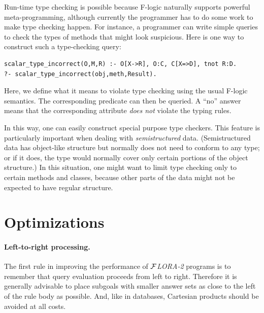 \documentclass[11pt]{article}
\newcommand{\FLORA}{{\mbox{${\cal F}${\small\it LORA}\rm\emph{-2}}}\xspace}
\newcommand{\fl}{\mbox{F-logic}\xspace}
\begin{document}
Run-time type checking is possible because \fl naturally supports powerful
meta-programming, although currently the programmer has to do some work to
make type checking happen.  For instance, a programmer can write simple
queries to check the types of methods that might look suspicious.  Here is
one way to construct such a type-checking query:
\begin{verbatim}
scalar_type_incorrect(O,M,R) :- O[X->R], O:C, C[X=>D], tnot R:D.
?- scalar_type_incorrect(obj,meth,Result).
\end{verbatim}
Here, we define what it means to violate type checking using the usual
\fl semantics. The corresponding predicate can then be queried. A
``no'' answer means that the corresponding attribute \emph{does not}
violate the typing rules.

In this way, one can easily construct special purpose type checkers.  This
feature is particularly important when dealing with \emph{semistructured}
data. (Semistructured data has object-like structure but normally does not
need to conform to any type; or if it does, the type would normally cover
only certain portions of the object structure.) In this situation, one
might want to limit type checking only to certain methods and classes,
because other parts of the data might not be expected to have regular
structure.


\section{Optimizations}

\paragraph{Left-to-right processing.}
The first rule in improving the performance of \FLORA programs is to
remember that query evaluation proceeds from left to right. Therefore it is
generally advisable to place subgoals with smaller answer sets as close to
the left of the rule body as possible. And, like in databases, Cartesian
products should be avoided at all costs.
\end{document}
